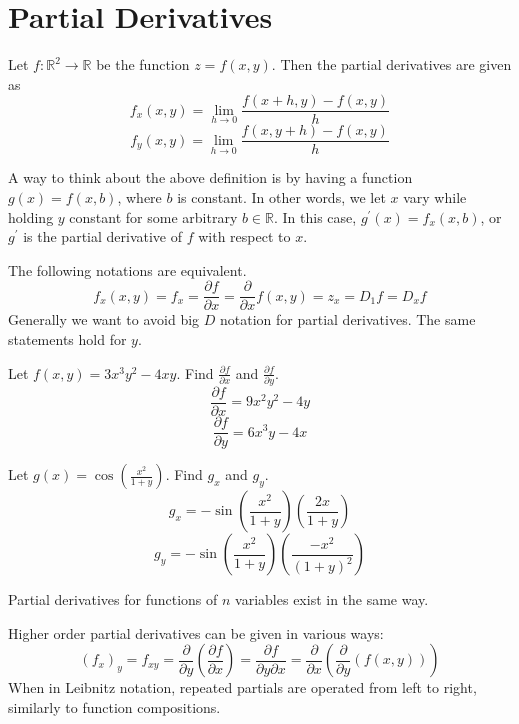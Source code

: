 \section{Partial Derivatives}
\begin{definition}
    Let \(f:\mathbb{R} ^2\to \mathbb{R} \) be the function \(z=f(x,y)\). Then the partial derivatives are given as 
    \[
        f_x (x,y)=\lim_{h\to 0}\frac{f(x+h,y)-f(x,y)}{h}
    \]
    \[
        f_y (x,y)=\lim_{h\to 0}\frac{f(x,y+h)-f(x,y)}{h}
    \]
\end{definition}
A way to think about the above definition is by having a function \(g(x)=f(x,b)\), where \(b\) is constant. In other words, we let \(x\) vary while holding \(y\) constant for some arbitrary \(b\in\mathbb{R} \). In this case, \(g^{\prime} (x)=f_x (x,b)\), or \(g^{\prime} \) is the partial derivative of \(f\) with respect to \(x\).
\begin{notation}
    The following notations are equivalent. 
    \[
        f_x (x,y)=f_x =\frac{\partial f}{\partial x}=\frac{\partial }{\partial x}f(x,y)=z_x =D_1 f=D_x f
    \]
    Generally we want to avoid big \(D\) notation for partial derivatives. The same statements hold for \(y\).
\end{notation}
\begin{eg}
    Let \(f(x,y)=3x^3 y^2 -4xy\). Find \(\frac{\partial f}{\partial x}\) and \(\frac{\partial f}{\partial y}\).
    \[
        \frac{\partial f}{\partial x}=9x^2 y^2 -4y
    \]
    \[
        \frac{\partial f}{\partial y}=6x^3 y-4x
    \]
\end{eg}
\newpage
\begin{eg}
    Let \(g(x)=\cos \left( \frac{x^2}{1+y} \right) \). Find \(g_x\) and \(g_y\). 
    \[
        g_x=-\sin \left( \frac{x^2}{1+y} \right) \left( \frac{2x}{1+y} \right)
    \]
    \[
        g_y =-\sin \left( \frac{x^2}{1+y} \right) \left( \frac{-x^2}{(1+y)^2} \right) 
    \]
\end{eg}
\begin{remark}
    Partial derivatives for functions of \(n\) variables exist in the same way.
\end{remark}
\begin{notation}
    Higher order partial derivatives can be given in various ways:
    \[
        \left( f_x \right)_y =f_{xy}=\frac{\partial }{\partial y}\left( \frac{\partial f}{\partial x} \right)  =\frac{\partial f}{\partial y\partial x}=\frac{\partial }{\partial x}\left( \frac{\partial }{\partial y}\left( f(x,y) \right)  \right)
    \]
    When in Leibnitz notation, repeated partials are operated from left to right, similarly to function compositions.
\end{notation}
